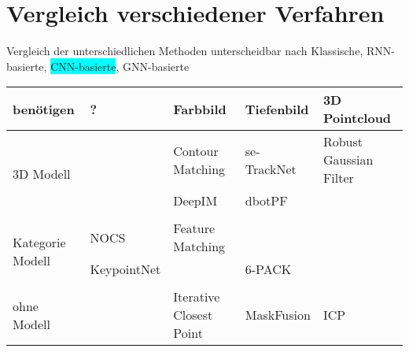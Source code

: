 \documentclass[a4paper, 11pt]{article}
\begin{document}
\section{Vergleich verschiedener Verfahren}
Vergleich der unterschiedlichen Methoden unterscheidbar nach \colorbox{Mahogany}{Klassische}, \colorbox{YellowOrange}{RNN-basierte}, \colorbox{Cyan}{CNN-basierte}, \colorbox{OliveGreen}{GNN-basierte}
\begin{table}
    \centering
    \begin{tabular}{p{1.5cm}|l|l|l|l}
        benötigen                             & ?                                     & Farbbild                                          & Tiefenbild                                        & 3D Pointcloud                               \\\hline
        \multirow{3}{1.5cm}{3D Modell}        &                                       & Contour Matching                                  & se-TrackNet\cite{se-TrackNet}                     & Robust Gaussian Filter\cite{GaussianFilter} \\
                                              &                                       & DeepIM\cite{Deepim}                               & dbotPF\cite{dbotPF}                               &                                             \\
                                              &                                       &                                                   &                                                   &                                             \\\hline
        \multirow{3}{1.5cm}{Kategorie Modell} & NOCS\cite{NormalizedObjectCoordiante} & Feature Matching                                  &                                                   &                                             \\
                                              & KeypointNet\cite{KeypointNet}         &                                                   & 6-PACK\cite{6pack}                                &                                             \\
                                              &                                       &                                                   &                                                   &                                             \\\hline
        \multirow{3}{1.5cm}{ohne Modell}      &                                       & Iterative Closest Point                           & MaskFusion\cite{MaskFusion}                       & ICP\cite{ICP}                               \\

\end{tabular}
\end{table}
\end{document}
